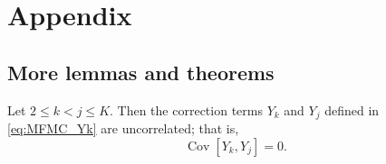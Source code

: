 \section{Appendix}\label{sec:Appendix}
\subsection{More lemmas and theorems}
\begin{lemma}\label{lemma:Y_k_Y_j}
Let $2\le k<j\le K$. Then the correction terms $Y_k$ and $Y_j$ defined in \eqref{eq:MFMC_Yk} are uncorrelated; that is,
\begin{equation*}
    \operatorname{Cov} \left[Y_k,Y_j\right]=0.
\end{equation*}
\end{lemma}

